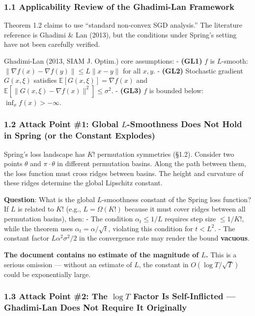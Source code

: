 \documentclass[
  12pt,
]{article}
\begin{document}
\subsubsection{1.1 Applicability Review of the Ghadimi-Lan Framework}\label{ghadimi-lan-applicability}

Theorem 1.2 claims to use ``standard non-convex SGD analysis.'' The literature reference is Ghadimi \& Lan (2013), but the conditions under Spring's setting have not been carefully verified.

Ghadimi-Lan (2013, SIAM J. Optim.) core assumptions:
- \textbf{(GL1)} $f$ is $L$-smooth: $\|\nabla f(x) - \nabla f(y)\| \leq L\|x - y\|$ for all $x, y$.
- \textbf{(GL2)} Stochastic gradient $G(x, \xi)$ satisfies $\mathbb{E}[G(x,\xi)] = \nabla f(x)$ and $\mathbb{E}[\|G(x,\xi) - \nabla f(x)\|^2] \leq \sigma^2$.
- \textbf{(GL3)} $f$ is bounded below: $\inf_x f(x) > -\infty$.

\subsubsection{1.2 Attack Point \#1: Global $L$-Smoothness Does Not Hold in Spring (or the Constant Explodes)}\label{attack-1-global-smoothness}

Spring's loss landscape has $K!$ permutation symmetries (\S1.2). Consider two points $\theta$ and $\pi \cdot \theta$ in different permutation basins. Along the path between them, the loss function must cross ridges between basins. The height and curvature of these ridges determine the global Lipschitz constant.

\textbf{Question}: What is the global $L$-smoothness constant of the Spring loss function? If $L$ is related to $K!$ (e.g., $L = \Omega(K!)$ because it must cover ridges between all permutation basins), then:
- The condition $\alpha_t \leq 1/L$ requires step size $\leq 1/K!$, while the theorem uses $\alpha_t = \alpha/\sqrt{t}$, violating this condition for $t < L^2$.
- The constant factor $L\alpha^2\sigma^2/2$ in the convergence rate may render the bound \textbf{vacuous}.

\textbf{The document contains no estimate of the magnitude of $L$.} This is a serious omission --- without an estimate of $L$, the constant in $O(\log T/\sqrt{T})$ could be exponentially large.

\subsubsection{1.3 Attack Point \#2: The $\log T$ Factor Is Self-Inflicted --- Ghadimi-Lan Does Not Require It Originally}\label{attack-2-logT-self-inflicted}
\end{document}
